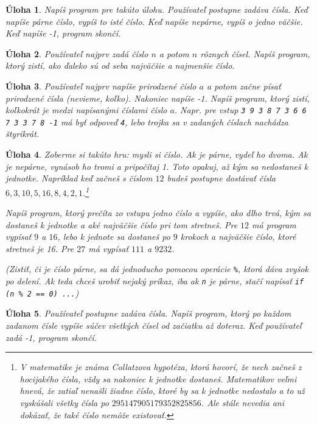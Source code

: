 \documentclass[10pt]{article}
\def\prg{\lstinline}
\def\ods{\vspace*{10pt}}
\newtheorem{uloha}{Úloha}
\begin{document}
\begin{uloha}
  Napíš program pre takúto úlohu.
  Používateľ postupne zadáva čísla. Keď napíše párne číslo, vypíš to isté číslo.
  Keď napíše nepárne, vypíš o jedno väčšie.
  Keď napíše -1, program skončí.
\end{uloha}

\begin{uloha}
  Používateľ najprv zadá číslo $n$ a potom $n$ rôznych čísel. Napíš program, ktorý zistí,
  ako ďaleko sú od seba najväčšie a najmenšie číslo.
\end{uloha}

\begin{uloha}
  Používateľ najprv napíše prirodzené číslo $a$ a potom začne písať
  prirodzené čísla (nevieme, koľko). Nakoniec napíše -1.
  Napíš program, ktorý zistí, koľkokrát je medzi napísanými číslami
  číslo $a$. Napr. pre vstup \prg!3 9 3 8 7 3 6 6 7 3 3 7 8 -1!
  má byť odpoveď \prg!4!, lebo trojka sa v zadaných číslach 
  nachádza štyrikrát.
\end{uloha}

\begin{uloha}
  Zoberme si takúto hru: mysli si číslo. Ak je párne, vydeľ ho dvoma. Ak je nepárne,
  vynásob ho tromi a pripočítaj 1. Toto opakuj, až kým sa nedostaneš k jednotke.
  Napríklad keď začneš s číslom $12$ budeš postupne dostávať čísla
  $6, 3, 10, 5, 16, 8, 4, 2, 1$.\footnote{V matematike je známa Collatzova hypotéza, ktorá 
  hovorí, že nech začneš z hocijakého čísla, vždy sa nakoniec k jednotke dostaneš.
  Matematikov veľmi hnevá, že zatiaľ nenašli žiadne číslo, ktoré
  by sa k jednotke nedostalo a to už vyskúšali všetky čísla  po
  $295147905179352825856$. Ale stále nevedia ani dokázať, že také číslo nemôže existovať.}

  \ods
  Napíš program, ktorý prečíta zo vstupu jedno číslo a vypíše, ako dlho trvá, kým
  sa dostaneš k jednotke a aké najväčšie číslo pri tom stretneš. Pre $12$
  má program vypísať $9$ a $16$, lebo k jednote sa dostaneš po $9$ krokoch a 
  najväčšie číslo, ktoré stretneš je 16. Pre $27$ má vypísať $111$ a $9232$.

  \ods
  (Zistiť, či je číslo párne, sa dá jednoducho pomocou operácie \prg!%
  dáva zvyšok po delení. Ak teda chceš urobiť nejaký príkaz, iba ak \prg!n!
  je párne, stačí napísať \prg!if (n %
\end{uloha}

\begin{uloha} Používateľ postupne zadáva čísla. Napíš program, ktorý
  po každom zadanom čísle vypíše súčev všetkých čísel od začiatku až doteraz.
  Keď používateľ zadá -1, program skončí.
\end{uloha}
\end{document}
